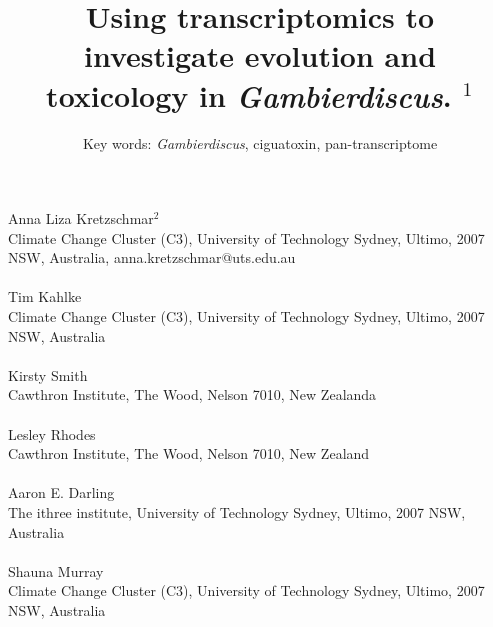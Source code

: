\documentclass[12pt]{article}
\title{Using transcriptomics to investigate evolution and toxicology in \textit{Gambierdiscus}. $^{1}$}
\author{Key words: \emph{Gambierdiscus}, ciguatoxin, pan-transcriptome}
\date{}
\begin{document}
\maketitle
\paragraph{}Anna Liza Kretzschmar$^{2}$\\
Climate Change Cluster (C3), University of Technology Sydney, Ultimo, 2007 NSW, Australia, anna.kretzschmar@uts.edu.au
\paragraph{}Tim Kahlke\\
Climate Change Cluster (C3), University of Technology Sydney, Ultimo, 2007 NSW, Australia
\paragraph{}Kirsty Smith \\
Cawthron Institute, The Wood, Nelson 7010, New Zealanda
\paragraph{}Lesley Rhodes \\
Cawthron Institute, The Wood, Nelson 7010, New Zealand
\paragraph{}Aaron E. Darling \\
The ithree institute, University of Technology Sydney, Ultimo, 2007 NSW, Australia
\paragraph{}Shauna Murray\\ 
Climate Change Cluster (C3), University of Technology Sydney, Ultimo, 2007 NSW, Australia
\newpage
\end{document}
